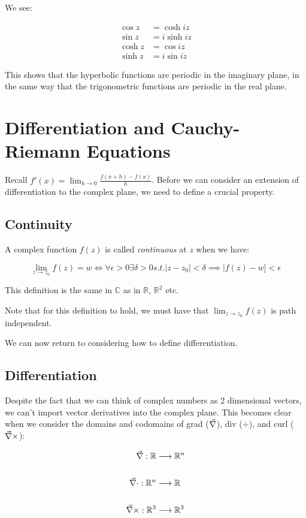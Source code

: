 \documentclass{../../physics_notes}
\begin{document}
We see:

\begin{align}
\cos{z} &= \cosh{iz} \\
\sin{z} &= i\sinh{iz} \\
\cosh{z} &= \cos{iz} \\
\sinh{z} &= i\sin{iz}
\end{align}

This shows that the hyperbolic functions are periodic in the imaginary plane, in the same way that the trigonometric functions are periodic in the real plane. 

\section{Differentiation and Cauchy-Riemann Equations}

Recall $f'(x) = \lim_{h\to 0} \frac{f(x + h) - f(x)}{h}$. Before we can consider an extension of differentiation to the complex plane, we need to define a crucial property.

\subsection{Continuity}

A complex function $f(z)$ is called \emph{continuous} at $z$ when we have:

\[ \lim_{z\to z_0} f(z) = w \iff \forall \epsilon > 0 \exists \delta > 0 s.t. |z - z_0| < \delta \implies |f(z) - w] < \epsilon \]

This definition is the same in $\mathbb{C}$ as in $\mathbb{R}$, $\mathbb{R}^2$ etc. 

Note that for this definition to hold, we must have that $\lim_{z\to z_0} f(z)$ is path independent. 

We can now return to considering how to define differentiation.

\subsection{Differentiation}

Despite the fact that we can think of complex numbers as 2 dimensional vectors, we can't import vector derivatives into the complex plane. This becomes clear when we consider the domains and codomains of grad ($\vec{\nabla}$), div ($\div$), and curl ($\vec{\nabla} \times$):

\begin{align*}
\vec{\nabla}: \mathbb{R} &\longrightarrow \mathbb{R}^n \\
&\\
\vec{\nabla} \cdot: \mathbb{R}^n &\longrightarrow \mathbb{R} \\
&\\
\vec{\nabla} \times: \mathbb{R}^3 &\longrightarrow \mathbb{R}^3 
\end{align*}
\end{document}
